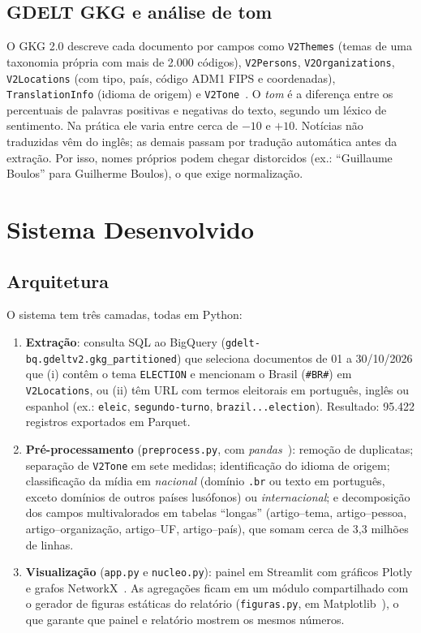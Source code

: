\documentclass[conference]{IEEEtran}
\begin{document}
\subsection{GDELT GKG e análise de tom}
O GKG 2.0 descreve cada documento por campos como \texttt{V2Themes} (temas de uma taxonomia própria com mais de 2.000 códigos), \texttt{V2Persons}, \texttt{V2Organizations}, \texttt{V2Locations} (com tipo, país, código ADM1 FIPS e coordenadas), \texttt{TranslationInfo} (idioma de origem) e \texttt{V2Tone}~\cite{leetaru2013}. O \emph{tom} é a diferença entre os percentuais de palavras positivas e negativas do texto, segundo um léxico de sentimento. Na prática ele varia entre cerca de $-10$ e $+10$. Notícias não traduzidas vêm do inglês; as demais passam por tradução automática antes da extração. Por isso, nomes próprios podem chegar distorcidos (ex.: ``Guillaume Boulos'' para Guilherme Boulos), o que exige normalização.

\section{Sistema Desenvolvido}\label{sec:sistema}

\subsection{Arquitetura}
O sistema tem três camadas, todas em Python:
\begin{enumerate}
  \item \textbf{Extração}: consulta SQL ao BigQuery (\texttt{gdelt-bq.gdeltv2.gkg\_partitioned}) que seleciona documentos de 01 a 30/10/2026 que (i) contêm o tema \texttt{ELECTION} e mencionam o Brasil (\texttt{\#BR\#}) em \texttt{V2Locations}, ou (ii) têm URL com termos eleitorais em português, inglês ou espanhol (ex.: \texttt{eleic}, \texttt{segundo-turno}, \texttt{brazil...election}). Resultado: 95.422 registros exportados em Parquet.
  \item \textbf{Pré-processamento} (\texttt{preprocess.py}, com \emph{pandas}~\cite{mckinney2010}): remoção de duplicatas; separação de \texttt{V2Tone} em sete medidas; identificação do idioma de origem; classificação da mídia em \emph{nacional} (domínio \texttt{.br} ou texto em português, exceto domínios de outros países lusófonos) ou \emph{internacional}; e decomposição dos campos multivalorados em tabelas ``longas'' (artigo--tema, artigo--pessoa, artigo--organização, artigo--UF, artigo--país), que somam cerca de 3,3 milhões de linhas.
  \item \textbf{Visualização} (\texttt{app.py} e \texttt{nucleo.py}): painel em Streamlit com gráficos Plotly e grafos NetworkX~\cite{hagberg2008}. As agregações ficam em um módulo compartilhado com o gerador de figuras estáticas do relatório (\texttt{figuras.py}, em Matplotlib~\cite{hunter2007}), o que garante que painel e relatório mostrem os mesmos números.
\end{enumerate}
\end{document}
